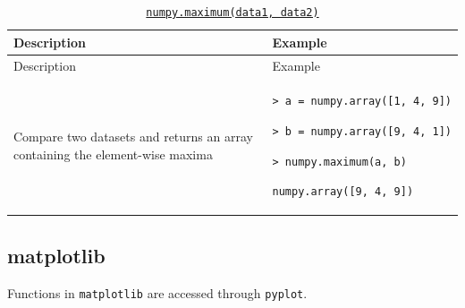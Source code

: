 \documentclass[10pt,a4paperpaper,]{article}
\begin{document}
\begin{longtable}[]{@{}ll@{}}
\caption{\href{http://docs.scipy.org/doc/numpy-1.10.0/reference/generated/numpy.maximum.html}{\texttt{numpy.maximum(data1,\ data2)}}}\tabularnewline
\toprule
\begin{minipage}[b]{0.47\columnwidth}\raggedright\strut
Description\strut
\end{minipage} & \begin{minipage}[b]{0.47\columnwidth}\raggedright\strut
Example\strut
\end{minipage}\tabularnewline
\midrule
\endfirsthead
\toprule
\begin{minipage}[b]{0.47\columnwidth}\raggedright\strut
Description\strut
\end{minipage} & \begin{minipage}[b]{0.47\columnwidth}\raggedright\strut
Example\strut
\end{minipage}\tabularnewline
\midrule
\endhead
\begin{minipage}[t]{0.47\columnwidth}\raggedright\strut
Compare two datasets and returns an array containing the element-wise
maxima\strut
\end{minipage} & \begin{minipage}[t]{0.47\columnwidth}\raggedright\strut
\texttt{\textgreater{}\ a\ =\ numpy.array({[}1,\ 4,\ 9{]})}

\texttt{\textgreater{}\ b\ =\ numpy.array({[}9,\ 4,\ 1{]})}

\texttt{\textgreater{}\ numpy.maximum(a,\ b)}

\texttt{numpy.array({[}9,\ 4,\ 9{]})}\strut
\end{minipage}\tabularnewline
\bottomrule
\end{longtable}

\subsection{matplotlib}\label{matplotlib}

Functions in \texttt{matplotlib} are accessed through \texttt{pyplot}.
\end{document}
